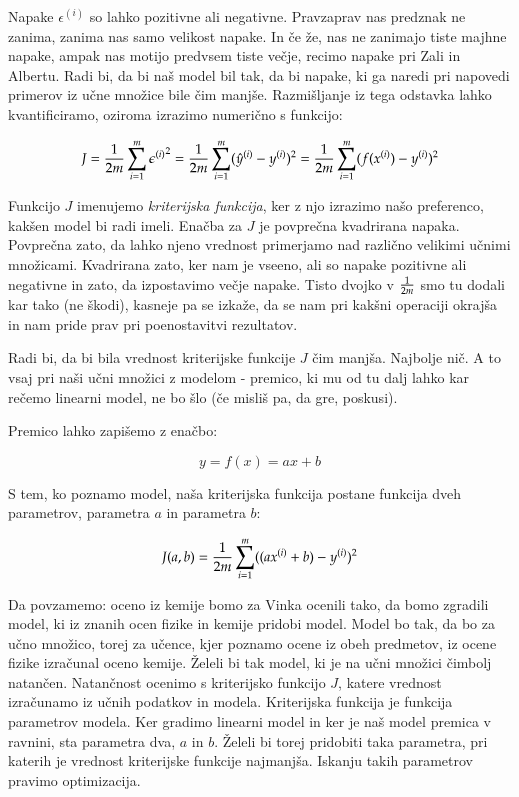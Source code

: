 Napake $\epsilon^{(i)}$ so lahko pozitivne ali negativne.
Pravzaprav nas predznak ne zanima, zanima nas samo velikost napake. In
če že, nas ne zanimajo tiste majhne napake, ampak nas motijo predvsem
tiste večje, recimo napake pri Zali in Albertu. Radi bi, da bi naš
model bil tak, da bi napake, ki ga naredi pri napovedi primerov iz
učne množice bile čim manjše. Razmišljanje iz tega odstavka lahko
kvantificiramo, oziroma izrazimo numerično s funkcijo:

\begin{equation}
J = {1\over 2m}\sum_{i=1}^m {\epsilon^{(i)}}^2 = {1\over 2m}\sum_{i=1}^m
(\hat{y}^{(i)}-y^{(i)})^2 = {1\over 2m}\sum_{i=1}^m (f(x^{(i)})-y^{(i)})^2
\label{eq:jab}
\end{equation}

Funkcijo $J$ imenujemo {\em kriterijska funkcija}, ker z njo izrazimo
našo preferenco, kakšen model bi radi imeli. Enačba za $J$ je
povprečna kvadrirana napaka. Povprečna zato, da lahko njeno vrednost
primerjamo nad različno velikimi učnimi množicami. Kvadrirana zato,
ker nam je vseeno, ali so napake pozitivne ali negativne in zato, da
izpostavimo večje napake. Tisto dvojko v $1\over 2m$ smo tu dodali kar
tako (ne škodi), kasneje pa se izkaže, da se nam pri kakšni operaciji
okrajša in nam pride prav pri poenostavitvi rezultatov.

Radi bi, da bi bila vrednost kriterijske funkcije $J$ čim
manjša. Najbolje nič. A to vsaj pri naši učni množici z modelom -
premico, ki mu od tu dalj lahko kar rečemo linearni model, ne bo šlo
(če misliš pa, da gre, poskusi).

Premico lahko zapišemo z enačbo:

\begin{equation}
  y=f(x)=a x + b
\end{equation}

S tem, ko poznamo model, naša kriterijska funkcija postane funkcija
dveh parametrov, parametra $a$ in parametra $b$:

\begin{equation}
  J(a, b) = {1\over 2m}\sum_{i=1}^m ((a x^{(i)} + b)-y^{(i)})^2
\end{equation}

Da povzamemo: oceno iz kemije bomo za Vinka ocenili tako, da bomo
zgradili model, ki iz znanih ocen fizike in kemije pridobi
model. Model bo tak, da bo za učno množico, torej za učence, kjer
poznamo ocene iz obeh predmetov, iz ocene fizike izračunal oceno
kemije. Želeli bi tak model, ki je na učni množici čimbolj
natančen. Natančnost ocenimo s kriterijsko funkcijo $J$, katere
vrednost izračunamo iz učnih podatkov in modela. Kriterijska funkcija
je funkcija parametrov modela. Ker gradimo linearni model in ker je
naš model premica v ravnini, sta parametra dva, $a$ in $b$. Želeli bi
torej pridobiti taka parametra, pri katerih je vrednost kriterijske
funkcije najmanjša. Iskanju takih parametrov pravimo optimizacija.

